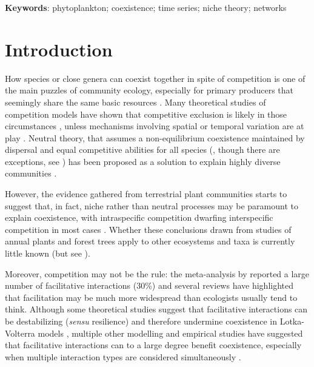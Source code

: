 \documentclass[10pt]{article}
\begin{document}
\textbf{Keywords}: phytoplankton; coexistence; time series; niche
theory; networks

\linenumbers

\newpage{}

\section*{Introduction}

How species or close genera can coexist together in spite of competition
is one of the main puzzles of community ecology, especially for primary
producers that seemingly share the same basic resources \citep{hutchinson_paradox_1961}.
Many theoretical studies of competition models have shown that competitive
exclusion is likely in those circumstances \citep{armstrong1980competitive,chesson_updates_2018},
unless mechanisms involving spatial or temporal variation are at play
\citep{armstrong1976coexistence,chesson_roles_1997,huisman_biological_2001,li_effects_2016}.
Neutral theory, that assumes a non-equilibrium coexistence maintained
by dispersal and equal competitive abilities for all species (\citealt{hubbell_unified_2001},
though there are exceptions, see \citealt{volkov_neutral_2003,volkov_patterns_2007})
has been proposed as a solution to explain highly diverse communities
\citep{hubbell_unified_2001,rosindell2011unified}.

However, the evidence gathered from terrestrial plant communities
starts to suggest that, in fact, niche rather than neutral processes
may be paramount to explain coexistence, with intraspecific competition
dwarfing interspecific competition in most cases \citep{adler_coexistence_2010,adler_competition_2018}.
Whether these conclusions drawn from studies of annual plants and
forest trees apply to other ecosystems and taxa is currently little
known (but see \citealt{mutshinda_what_2009}).

Moreover, competition may not
be the rule: the meta-analysis by \citet{adler_competition_2018}
reported a large number of facilitative interactions (30\%) and several
reviews \citep{brooker_facilitation_2008,mcintire2014facilitation}
have highlighted that facilitation may be much more widespread than
ecologists usually tend to think. Although some theoretical studies
suggest that facilitative interactions can be destabilizing (\emph{sensu}
resilience) and therefore undermine coexistence in Lotka-Volterra
models \citep{coyte_ecology_2015}, multiple other modelling \citep{gross_positive_2008}
and empirical \citep{brooker_facilitation_2008,cavieres2009facilitative}
studies have suggested that facilitative interactions can to a large
degree benefit coexistence, especially when multiple interaction types
are considered simultaneously \citep{mougi2012diversity,garcia2018effect}.
\end{document}
